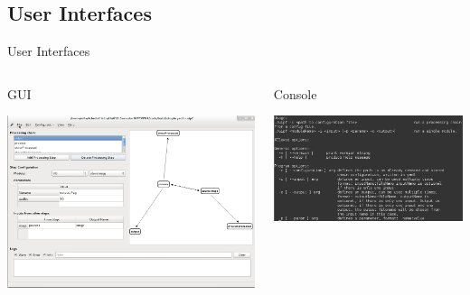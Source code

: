 \documentclass{beamer}
\begin{document}
\subsection{User Interfaces}
\begin{frame}[t]{User Interfaces}

	\begin{columns}
		\begin{column}[t]{.5\textwidth}
			\begin{center}
			{\Large GUI}
			\vspace{.5cm}

			\includegraphics[width=\textwidth]{images/howto/gui}

			\end{center}
		\end{column}
		\begin{column}[t]{.5\textwidth}
			\begin{center}
			{\Large Console}
			\vspace{.5cm}

			\includegraphics[width=\textwidth]{images/howto/console}


\end{center}
\end{column}
\end{columns}
\end{frame}
\end{document}
